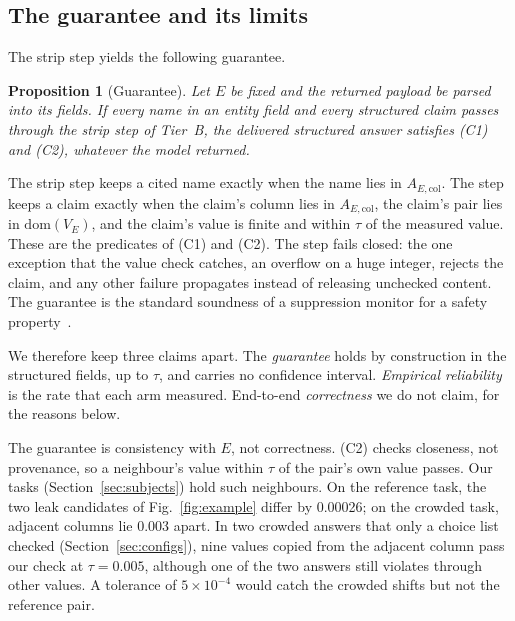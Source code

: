 \documentclass[journal]{IEEEtran}
\newtheorem{proposition}{Proposition}
\begin{document}
\subsection{The guarantee and its limits}\label{sec:limits}

The strip step yields the following guarantee.

\begin{proposition}[Guarantee]\label{prop:guarantee}
Let $E$ be fixed and the returned payload be parsed into its fields. If every
name in an entity field and every structured claim passes through the strip step
of Tier~B, the delivered structured answer satisfies (C1) and (C2), whatever the
model returned.
\end{proposition}

\begin{IEEEproof}
The strip step keeps a cited name exactly when the name lies in
$A_{E,\mathrm{col}}$. The step keeps a claim exactly when the claim's column lies
in $A_{E,\mathrm{col}}$, the claim's pair lies in $\mathrm{dom}(V_E)$, and the
claim's value is finite and within $\tau$ of the measured value. These are the
predicates of (C1) and (C2). The step fails closed: the one exception that the
value check catches, an overflow on a huge integer, rejects the claim, and any
other failure propagates instead of releasing unchecked content. The guarantee is
the standard soundness of a suppression monitor for a safety
property~\cite{schneider2000enforceable,ligatti2005edit}.
\end{IEEEproof}

We therefore keep three claims apart. The \emph{guarantee} holds by construction
in the structured fields, up to $\tau$, and carries no confidence interval.
\emph{Empirical reliability} is the rate that each arm measured. End-to-end
\emph{correctness} we do not claim, for the reasons below.

The guarantee is consistency with $E$, not correctness. (C2) checks closeness,
not provenance, so a neighbour's value within $\tau$ of the pair's own value
passes. Our tasks (Section~\ref{sec:subjects}) hold such neighbours. On the
reference task, the two leak candidates of Fig.~\ref{fig:example} differ by
0.00026; on the crowded task, adjacent columns lie 0.003 apart. In two crowded
answers that only a choice list checked (Section~\ref{sec:configs}), nine values
copied from the adjacent column pass our check at $\tau=0.005$, although one of
the two answers still violates through other values. A tolerance of
$5\times10^{-4}$ would catch the crowded shifts but not the reference pair.
\end{document}
